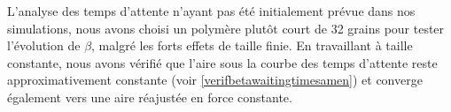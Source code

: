 %
%
%
%





L'analyse des temps d'attente n'ayant pas été initialement prévue dans nos simulations, nous avons choisi un polymère plutôt court de 32 grains pour tester l'évolution de $\beta$,  malgré les forts effets de taille finie. En travaillant à taille constante, nous avons vérifié que l'aire sous la courbe des temps d'attente reste approximativement constante (voir \ref{verifbetawaitingtimesamen}) et converge également vers une aire réajustée en force constante.

\newpage


